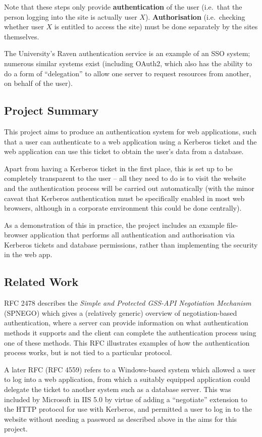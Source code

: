 \documentclass{article}
\begin{document}
Note that these steps only provide \textbf{authentication} of the user (i.e.\ that the person logging into the site is actually user $X$). \textbf{Authorisation} (i.e.\ checking whether user $X$ is entitled to access the site) must be done separately by the sites themselves.

The University's Raven authentication service is an example of an SSO system; numerous similar systems exist (including OAuth2, which also has the ability to do a form of ``delegation'' to allow one server to request resources from another, on behalf of the user\cite{Oracle-OAuth2}).

\subsection{Project Summary}
This project aims to produce an authentication system for web applications, such that a user can authenticate to a web application using a Kerberos ticket and the web application can use this ticket to obtain the user's data from a database.

Apart from having a Kerberos ticket in the first place, this is set up to be completely transparent to the user -- all they need to do is to visit the website and the authentication process will be carried out automatically (with the minor caveat that Kerberos authentication must be specifically enabled in most web browsers, although in a corporate environment this could be done centrally).

As a demonstration of this in practice, the project includes an example file-browser application that performs all authentication and authorisation via Kerberos tickets and database permissions, rather than implementing the security in the web app.

\subsection{Related Work}
RFC 2478\cite{RFC2478} describes the \textit{Simple and Protected GSS-API Negotiation Mechanism} (SPNEGO) which gives a (relatively generic) overview of negotiation-based authentication, where a server can provide information on what authentication methods it supports and the client can complete the authentication process using one of these methods. This RFC illustrates examples of how the authentication process works, but is not tied to a particular protocol.

A later RFC (RFC 4559\cite{RFC4559}) refers to a Windows-based system which allowed a user to log into a web application, from which a suitably equipped application could delegate the ticket to another system such as a database server. This was included by Microsoft in IIS 5.0 by virtue of adding a ``negotiate'' extension to the HTTP protocol for use with Kerberos, and permitted a user to log in to the website without needing a password as described above in the aims for this project.
\end{document}
